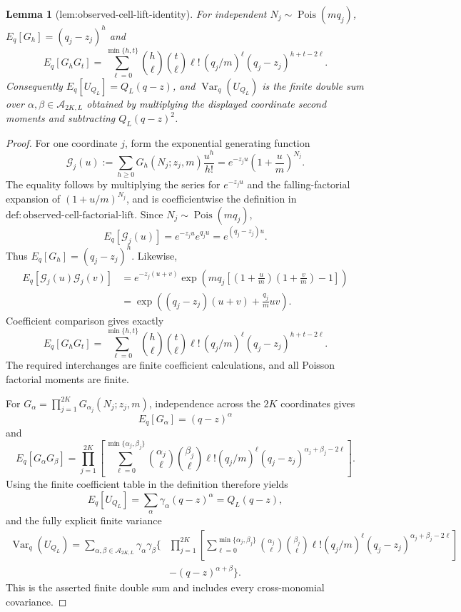 \documentclass{article}
\newtheorem{lemma}{Lemma}
\begin{document}
\begin{lemma}[lem:observed-cell-lift-identity]\label{lem:observed-cell-lift-identity}
For independent \(N_j\sim\operatorname{Pois}(m q_j)\), \(E_q[G_h]=(q_j-z_j)^h\) and \[E_q[G_hG_t]=\sum_{\ell=0}^{\min\{h,t\}}\binom h\ell\binom t\ell\ell!\,(q_j/m)^\ell(q_j-z_j)^{h+t-2\ell}.\] Consequently \(E_q[U_{Q_L}]=Q_L(q-z)\), and \(\operatorname{Var}_q(U_{Q_L})\) is the finite double sum over \(\alpha,\beta\in\mathcal A_{2K,L}\) obtained by multiplying the displayed coordinate second moments and subtracting \(Q_L(q-z)^2\).
\end{lemma}
\begin{proof}
For one coordinate \(j\), form the exponential generating function
\[
 \mathcal G_j(u):=\sum_{h\geq0}G_h(N_j;z_j,m)\frac{u^h}{h!}
 =e^{-z_ju}\left(1+\frac um\right)^{N_j}.
\]
The equality follows by multiplying the series for \(e^{-z_ju}\) and the falling-factorial expansion of \((1+u/m)^{N_j}\), and is coefficientwise the definition in \(\mathrm{def{:}observed\text{-}cell\text{-}factorial\text{-}lift}\).  Since \(N_j\sim\operatorname{Pois}(mq_j)\),
\[
 E_q[\mathcal G_j(u)]=e^{-z_ju}e^{q_ju}=e^{(q_j-z_j)u}.
\]
Thus \(E_q[G_h]=(q_j-z_j)^h\).  Likewise,
\[
 \begin{aligned}
 E_q[\mathcal G_j(u)\mathcal G_j(v)]
 &=e^{-z_j(u+v)}
   \exp\!\left(mq_j\left[\left(1+\frac um\right)
                                 \left(1+\frac vm\right)-1\right]\right)\\
 &=\exp\!\left((q_j-z_j)(u+v)+\frac{q_j}{m}uv\right).
 \end{aligned}
\]
Coefficient comparison gives exactly
\[
 E_q[G_hG_t]
 =\sum_{\ell=0}^{\min\{h,t\}}
   \binom h\ell\binom t\ell\ell!\,(q_j/m)^\ell
   (q_j-z_j)^{h+t-2\ell}.
\]
The required interchanges are finite coefficient calculations, and all Poisson factorial moments are finite.

For \(G_\alpha=\prod_{j=1}^{2K}G_{\alpha_j}(N_j;z_j,m)\), independence across the \(2K\) coordinates gives
\[
 E_q[G_\alpha]=(q-z)^\alpha
\]
and
\[
 E_q[G_\alpha G_\beta]
 =\prod_{j=1}^{2K}\left[
   \sum_{\ell=0}^{\min\{\alpha_j,\beta_j\}}
   \binom{\alpha_j}\ell\binom{\beta_j}\ell\ell!
   (q_j/m)^\ell(q_j-z_j)^{\alpha_j+\beta_j-2\ell}
 \right].
\]
Using the finite coefficient table in the definition therefore yields
\[
 E_q[U_{Q_L}]=\sum_\alpha\gamma_\alpha(q-z)^\alpha=Q_L(q-z),
\]
and the fully explicit finite variance
\[
 \begin{aligned}
 \operatorname{Var}_q(U_{Q_L})
 =\sum_{\alpha,\beta\in\mathcal A_{2K,L}}\gamma_\alpha\gamma_\beta
 \Bigg\{&\prod_{j=1}^{2K}\left[
   \sum_{\ell=0}^{\min\{\alpha_j,\beta_j\}}
   \binom{\alpha_j}\ell\binom{\beta_j}\ell\ell!
   (q_j/m)^\ell(q_j-z_j)^{\alpha_j+\beta_j-2\ell}
 \right]\\
 &-(q-z)^{\alpha+\beta}\Bigg\}.
 \end{aligned}
\]
This is the asserted finite double sum and includes every cross-monomial covariance.
\end{proof}
\end{document}
